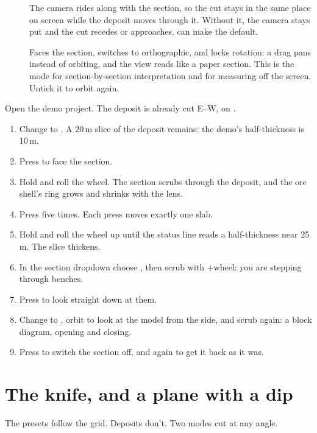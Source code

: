 \begin{description}
\item[] The camera rides along with the section, so the cut stays in the same place on screen while the deposit moves through it. Without it, the camera stays put and the cut recedes or approaches.  can make  the default.
\item[] Faces the section, switches to orthographic, and locks rotation: a drag pans instead of orbiting, and the view reads like a paper section. This is the mode for section-by-section interpretation and for measuring off the screen. Untick it to orbit again.
\end{description}

\begin{tryit}
Open the demo project. The deposit is already cut E–W, on .
\begin{enumerate}
\item Change  to . A 20\,m slice of the deposit remains: the demo's half-thickness is 10\,m.
\item Press  to face the section.
\item Hold  and roll the wheel. The section scrubs through the deposit, and the ore shell's ring grows and shrinks with the lens.
\item Press  five times. Each press moves exactly one slab.
\item Hold  and roll the wheel up until the status line reads a half-thickness near 25\,m. The slice thickens.
\item In the section dropdown choose , then scrub with +wheel: you are stepping through benches.
\item Press  to look straight down at them.
\item Change  to , orbit to look at the model from the side, and scrub again: a block diagram, opening and closing.
\item Press  to switch the section off, and  again to get it back as it was.
\end{enumerate}
\end{tryit}

\section{The knife, and a plane with a dip}\label{sec:sections-knife}
The presets follow the grid. Deposits don't. Two modes cut at any angle.


